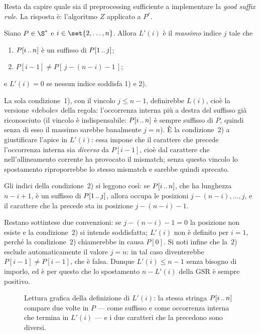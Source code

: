Resta da capire quale sia il preprocessing sufficiente a implementare la
\emph{good suffix rule}. La risposta è: l'algoritmo $Z$ applicato a $P^r$.

\begin{definizione}[$L'(i)$]\label{def:bm-lprimo}
Siano $P\in\alfa^*$ e $i\in\set{2,\dots,n}$. Allora $L'(i)$ è il \emph{massimo}
indice $j$ tale che
\begin{enumerate}
  \item $P[i\,..\,n]$ è un suffisso di $P[1\,..\,j]$;
  \item $P[i-1]\neq P[\,j-(n-i)-1\,]$;
\end{enumerate}
e $L'(i)=0$ se nessun indice soddisfa 1) e 2).
\end{definizione}

\begin{osservazione}
La sola condizione~1), con il vincolo $j\le n-1$, definirebbe $L(i)$, cioè la
versione «debole» della regola: l'occorrenza interna più a destra del suffisso già
riconosciuto (il vincolo è indispensabile: $P[i\,..\,n]$ è sempre suffisso di
$P$, quindi senza di esso il massimo sarebbe banalmente $j=n$). È la condizione~2)
a giustificare l'apice in $L'(i)$: essa impone che il carattere che precede
l'occorrenza interna sia \emph{diverso} da $P[i-1]$, cioè dal carattere che
nell'allineamento corrente ha provocato il mismatch; senza questo vincolo lo
spostamento riproporrebbe lo stesso mismatch e sarebbe quindi sprecato.

Gli indici della condizione~2) si leggono così: se $P[i\,..\,n]$, che ha lunghezza
$n-i+1$, è un suffisso di $P[1\,..\,j]$, allora occupa le posizioni
$j-(n-i),\dots,j$, e il carattere che la precede sta in posizione $j-(n-i)-1$.

Restano sottintese due convenzioni: se $j-(n-i)-1=0$ la posizione non esiste e la
condizione~2) si intende soddisfatta; $L'(i)$ non è definito per $i=1$, perché la
condizione~2) chiamerebbe in causa $P[0]$. Si noti infine che la~2) esclude
automaticamente il valore $j=n$: in tal caso diventerebbe $P[i-1]\neq P[i-1]$, che è
falsa. Dunque $L'(i)\le n-1$ senza bisogno di imporlo, ed è per questo che lo
spostamento $n-L'(i)$ della GSR è sempre positivo.
\end{osservazione}

\begin{figure}[H]
\centering

\caption{Lettura grafica della definizione di $L'(i)$: la stessa stringa
$P[i\,..\,n]$ compare due volte in $P$ --- come suffisso e come occorrenza interna
che termina in $L'(i)$ --- e i due caratteri che la precedono sono diversi.}
\end{figure}

